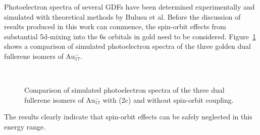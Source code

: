 Photoelectron spectra of several \acp{GDF} have been determined experimentally
and simulated with theoretical methods by Bulusu et
al.\autocite{Bulusu_Evidencehollowgolden_2006} Before the discussion of results
produced in this work can commence, the spin-orbit effects from substantial
5d-mixing into the 6s orbitals in gold need to be considered.
Figure~\ref{fig:photoSOAu17} shows a comparison of simulated photoelectron
spectra of the three golden dual fullerene isomers of Au$_{17}^-$.
%
\begin{figure}[htb]\centering
	\hfill
	\\
	\caption{Comparison of simulated photoelectron spectra of the three dual fullerene isomers of Au$_{17}^-$ with (2c) and without spin-orbit coupling.} 
	\label{fig:photoSOAu17}
\end{figure}
%
The results clearly indicate that spin-orbit effects can be safely neglected in this
energy range.

